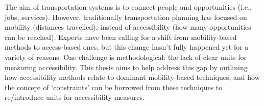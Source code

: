 \documentclass[
11pt, %
oneside, %
english, %
singlespacing, %
]{macthesis} %
\def\blankpage{%
      \clearpage%
      \thispagestyle{empty}%
      \addtocounter{page}{-1}%
      \null%
      \clearpage}
\begin{document}
  The aim of transportation systems is to connect people and opportunities (i.e., jobs, services). However, traditionally transportation planning has focused on mobility (distances travelled), instead of accessibility (how many opportunities can be reached). Experts have been calling for a shift from mobility-based methods to access-based ones, but this change hasn't fully happened yet for a variety of reasons. One challenge is methodological: the lack of clear units for measuring accessibility. This thesis aims to help address this gap by outlining how accessibility methods relate to dominant mobility-based techniques, and how the concept of `constraints' can be borrowed from these techniques to re/introduce units for accessibility measures.
\blankpage
\clearpage


\end{document}
